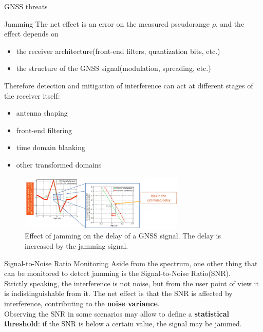\begin{section}{GNSS threats}
\begin{subsection}{Jamming}
        The net effect is an error on the measured pseudorange $\rho$, and the effect depends on
        \begin{itemize}
          \item the receiver architecture(front-end filters, quantization bits, etc.)
          \item the structure of the GNSS signal(modulation, spreading, etc.)
        \end{itemize}
        Therefore detection and mitigation of interference can act at different stages of the 
        receiver itself:
        \begin{itemize}
          \item antenna shaping
          \item front-end filtering
          \item time domain blanking
          \item other transformed domains
        \end{itemize}

        \begin{figure}[h]
          \centering
          \includegraphics[width=0.7\textwidth]{img/wireless/jamming delay effect.png}
          \caption{Effect of jamming on the delay of a GNSS signal. The delay is increased by the
            jamming signal.}
          \label{fig:GNSS jamming effect}
        \end{figure}
        \begin{subsubsection}{Signal-to-Noise Ratio Monitoring}
          Aside from the spectrum, one other thing that can be monitored to detect jamming is the
          Signal-to-Noise Ratio(SNR).\\
          Strictly speaking, the interference is not noise, but from the user point of view it is
          indistinguishable from it. The net effect is that the SNR is affected by interference,
          contributing to the \textbf{noise variance}.\\

          Observing the SNR in some scenarios may allow to define a \textbf{statistical threshold}: 
          if the SNR is below a certain value, the signal may be jammed.\\


\end{subsubsection}
\end{subsection}
\end{section}
